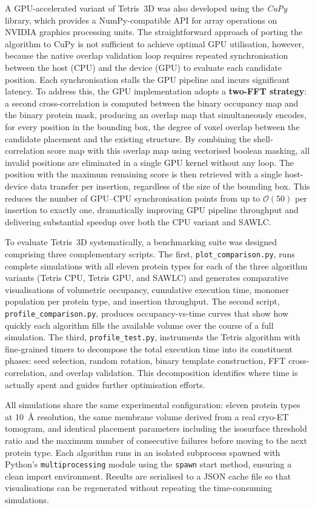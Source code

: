 A GPU-accelerated variant of Tetris~3D was also developed using the \textit{CuPy} library,
which provides a NumPy-compatible API for array operations on NVIDIA graphics processing units.
The straightforward approach of porting the algorithm to CuPy is not sufficient to achieve
optimal GPU utilisation, however, because the native overlap validation loop requires repeated
synchronisation between the host (CPU) and the device (GPU) to evaluate each candidate position.
Each synchronisation stalls the GPU pipeline and incurs significant latency. To address this,
the GPU implementation adopts a \textbf{two-FFT strategy}: a second cross-correlation is computed
between the binary occupancy map and the binary protein mask, producing an overlap map that
simultaneously encodes, for every position in the bounding box, the degree of voxel overlap
between the candidate placement and the existing structure. By combining the shell-correlation
score map with this overlap map using vectorised boolean masking, all invalid positions are
eliminated in a single GPU kernel without any loop. The position with the maximum remaining
score is then retrieved with a single host-device data transfer per insertion, regardless of
the size of the bounding box. This reduces the number of GPU–CPU synchronisation points from
up to $\mathcal{O}(50)$ per insertion to exactly one, dramatically improving GPU pipeline
throughput and delivering substantial speedup over both the CPU variant and SAWLC.

To evaluate Tetris~3D systematically, a benchmarking suite was designed comprising three
complementary scripts. The first, \texttt{plot\_comparison.py}, runs complete simulations with
all eleven protein types for each of the three algorithm variants (Tetris CPU, Tetris GPU, and
SAWLC) and generates comparative visualisations of volumetric occupancy, cumulative execution
time, monomer population per protein type, and insertion throughput. The second script,
\texttt{profile\_comparison.py}, produces occupancy-vs-time curves that show how quickly each
algorithm fills the available volume over the course of a full simulation. The third,
\texttt{profile\_test.py}, instruments the Tetris algorithm with fine-grained timers to decompose
the total execution time into its constituent phases: seed selection, random rotation, binary
template construction, FFT cross-correlation, and overlap validation. This decomposition
identifies where time is actually spent and guides further optimisation efforts.

All simulations share the same experimental configuration: eleven protein types at 10~Å
resolution, the same membrane volume derived from a real cryo-ET tomogram, and identical
placement parameters including the isosurface threshold ratio and the maximum number of
consecutive failures before moving to the next protein type. Each algorithm runs in an isolated
subprocess spawned with Python's \texttt{multiprocessing} module using the \texttt{spawn}
start method, ensuring a clean import environment. Results are serialised to a JSON cache file
so that visualisations can be regenerated without repeating the time-consuming simulations.

